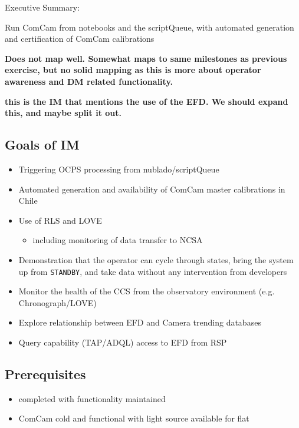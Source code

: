
Executive Summary:

Run ComCam from notebooks and the scriptQueue, with automated generation and certification of ComCam calibrations

\textbf{Does not map well. Somewhat maps to same milestones as previous exercise, but no solid mapping as this is more about operator awareness and DM related functionality. }

\textbf{\Nb this is the IM that mentions the use of the EFD.  We should expand this, and maybe split it out.}

\subsection{Goals of IM}
\label{sec:org3154347}
\begin{itemize}
	\item Triggering \gls{OCPS} processing from nublado/scriptQueue
	\item Automated generation and availability of ComCam master calibrations in Chile
	\item Use of \gls{RLS} and \gls{LOVE}
	\begin{itemize}
		\item including monitoring of data transfer to NCSA
	\end{itemize}
	\item Demonstration that the operator can cycle through states, bring
	the system up from \texttt{STANDBY}, and take data without any intervention from developers
	\item Monitor the health of the \gls{CCS} from the observatory environment (e.g. Chronograph/\gls{LOVE})
	\item Explore relationship between \gls{EFD} and Camera trending databases
	\item Query capability (TAP/ADQL) access to \gls{EFD} from \gls{RSP}
\end{itemize}

\subsection{Prerequisites}
\begin{itemize}
	\item{ completed with functionality maintained}
	\item{ComCam cold and functional with light source available for flat}
\end{itemize}


